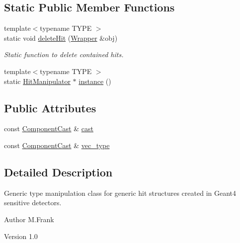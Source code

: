 \subsection*{Static Public Member Functions}
\begin{DoxyCompactItemize}
\item 
{\footnotesize template$<$typename TYPE $>$ }\\static void \hyperlink{class_d_d4hep_1_1_simulation_1_1_geant4_hit_wrapper_1_1_hit_manipulator_a6c55d83023a6fcc13971bb3ca50f1384}{deleteHit} (\hyperlink{class_d_d4hep_1_1_simulation_1_1_geant4_hit_wrapper_1_1_hit_manipulator_a4bb62cc7e4979a8d0aea281477a4e38e}{Wrapper} \&obj)
\begin{DoxyCompactList}\small\item\em Static function to delete contained hits. \item\end{DoxyCompactList}\item 
{\footnotesize template$<$typename TYPE $>$ }\\static \hyperlink{class_d_d4hep_1_1_simulation_1_1_geant4_hit_wrapper_1_1_hit_manipulator}{HitManipulator} $\ast$ \hyperlink{class_d_d4hep_1_1_simulation_1_1_geant4_hit_wrapper_1_1_hit_manipulator_acba054bd41db4731407713d4a1cdfd47}{instance} ()
\end{DoxyCompactItemize}
\subsection*{Public Attributes}
\begin{DoxyCompactItemize}
\item 
const \hyperlink{class_d_d4hep_1_1_component_cast}{ComponentCast} \& \hyperlink{class_d_d4hep_1_1_simulation_1_1_geant4_hit_wrapper_1_1_hit_manipulator_a81d93c2f45fdb16c6b590401236f1ed5}{cast}
\item 
const \hyperlink{class_d_d4hep_1_1_component_cast}{ComponentCast} \& \hyperlink{class_d_d4hep_1_1_simulation_1_1_geant4_hit_wrapper_1_1_hit_manipulator_abe16127974bebf369e7719b4e72c0647}{vec\_\-type}
\end{DoxyCompactItemize}


\subsection{Detailed Description}
Generic type manipulation class for generic hit structures created in Geant4 sensitive detectors. \begin{DoxyAuthor}{Author}
M.Frank 
\end{DoxyAuthor}
\begin{DoxyVersion}{Version}
1.0 
\end{DoxyVersion}


